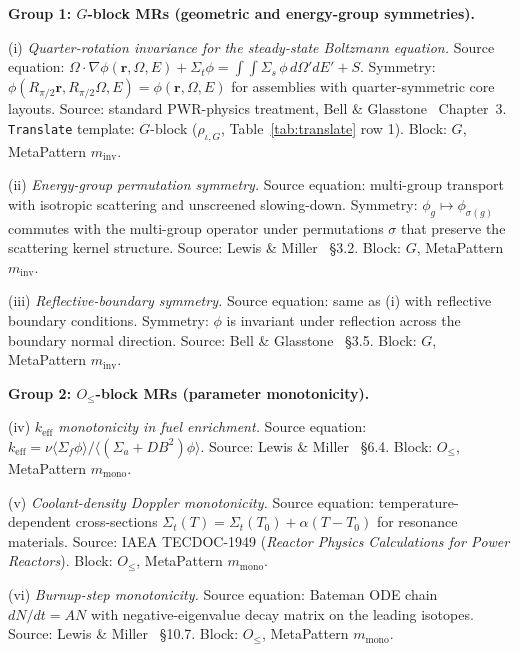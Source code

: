 \noindent\textbf{Group 1: $G$-block MRs (geometric and energy-group symmetries).}

\noindent (i) \emph{Quarter-rotation invariance for the steady-state Boltzmann equation.} Source equation: $\Omega \cdot \nabla\phi(\mathbf{r}, \Omega, E) + \Sigma_t \phi = \int \int \Sigma_s\, \phi\, d\Omega' dE' + S$. Symmetry: $\phi(R_{\pi/2}\mathbf{r}, R_{\pi/2}\Omega, E) = \phi(\mathbf{r}, \Omega, E)$ for assemblies with quarter-symmetric core layouts. Source: standard PWR-physics treatment, Bell \& Glasstone~\cite{BellGlasstone1970} Chapter~3. \texttt{Translate} template: $G$-block ($\rho_{\iota,G}$, Table~\ref{tab:translate} row 1). Block: $G$, MetaPattern $m_{\mathrm{inv}}$.

\noindent (ii) \emph{Energy-group permutation symmetry.} Source equation: multi-group transport with isotropic scattering and unscreened slowing-down. Symmetry: $\phi_g \mapsto \phi_{\sigma(g)}$ commutes with the multi-group operator under permutations $\sigma$ that preserve the scattering kernel structure. Source: Lewis \& Miller~\cite{LewisMiller1993} §3.2. Block: $G$, MetaPattern $m_{\mathrm{inv}}$.

\noindent (iii) \emph{Reflective-boundary symmetry.} Source equation: same as (i) with reflective boundary conditions. Symmetry: $\phi$ is invariant under reflection across the boundary normal direction. Source: Bell \& Glasstone~\cite{BellGlasstone1970} §3.5. Block: $G$, MetaPattern $m_{\mathrm{inv}}$.

\noindent\textbf{Group 2: $O_{\le}$-block MRs (parameter monotonicity).}

\noindent (iv) \emph{$k_{\mathrm{eff}}$ monotonicity in fuel enrichment.} Source equation: $k_{\mathrm{eff}} = \nu \langle\Sigma_f \phi\rangle / \langle (\Sigma_a + DB^2) \phi\rangle$. Source: Lewis \& Miller~\cite{LewisMiller1993} §6.4. Block: $O_{\le}$, MetaPattern $m_{\mathrm{mono}}$.

\noindent (v) \emph{Coolant-density Doppler monotonicity.} Source equation: temperature-dependent cross-sections $\Sigma_t(T) = \Sigma_t(T_0) + \alpha (T-T_0)$ for resonance materials. Source: IAEA TECDOC-1949 (\emph{Reactor Physics Calculations for Power Reactors}). Block: $O_{\le}$, MetaPattern $m_{\mathrm{mono}}$.

\noindent (vi) \emph{Burnup-step monotonicity.} Source equation: Bateman ODE chain $dN/dt = AN$ with negative-eigenvalue decay matrix on the leading isotopes. Source: Lewis \& Miller~\cite{LewisMiller1993} §10.7. Block: $O_{\le}$, MetaPattern $m_{\mathrm{mono}}$.

